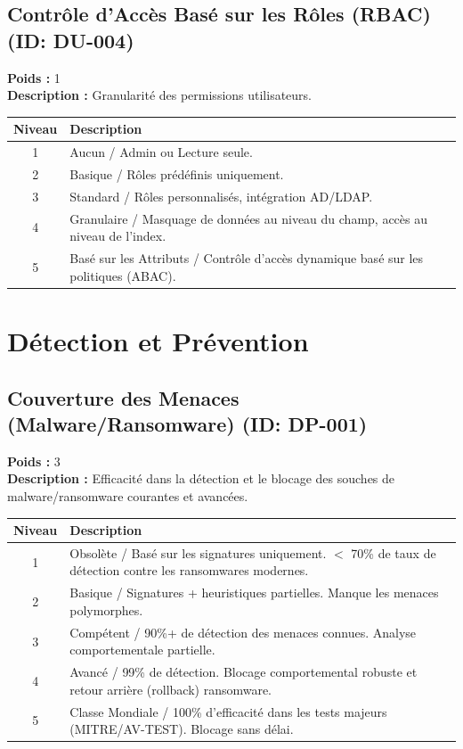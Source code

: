 \documentclass{article}
\begin{document}
\subsection{Contrôle d'Accès Basé sur les Rôles (RBAC) (ID: DU-004)}
\textbf{Poids :} 1 \\
\textbf{Description :} Granularité des permissions utilisateurs.
\vspace{0.3cm}
\begin{longtable}{|c|p{12cm}|}
\hline
\rowcolor{lightgray} \textbf{Niveau} & \textbf{Description} \\ \hline
1 & Aucun / Admin ou Lecture seule. \\ \hline
2 & Basique / Rôles prédéfinis uniquement. \\ \hline
3 & Standard / Rôles personnalisés, intégration AD/LDAP. \\ \hline
4 & Granulaire / Masquage de données au niveau du champ, accès au niveau de l'index. \\ \hline
5 & Basé sur les Attributs / Contrôle d'accès dynamique basé sur les politiques (ABAC). \\ \hline
\end{longtable}
\vspace{0.5cm}
\section{Détection et Prévention}
\subsection{Couverture des Menaces (Malware/Ransomware) (ID: DP-001)}
\textbf{Poids :} 3 \\
\textbf{Description :} Efficacité dans la détection et le blocage des souches de malware/ransomware courantes et avancées.
\vspace{0.3cm}
\begin{longtable}{|c|p{12cm}|}
\hline
\rowcolor{lightgray} \textbf{Niveau} & \textbf{Description} \\ \hline
1 & Obsolète / Basé sur les signatures uniquement. $<$ 70\% de taux de détection contre les ransomwares modernes. \\ \hline
2 & Basique / Signatures + heuristiques partielles. Manque les menaces polymorphes. \\ \hline
3 & Compétent / 90\%+ de détection des menaces connues. Analyse comportementale partielle. \\ \hline
4 & Avancé / 99\% de détection. Blocage comportemental robuste et retour arrière (rollback) ransomware. \\ \hline
5 & Classe Mondiale / 100\% d'efficacité dans les tests majeurs (MITRE/AV-TEST). Blocage sans délai. \\ \hline
\end{longtable}
\vspace{0.5cm}
\end{document}
